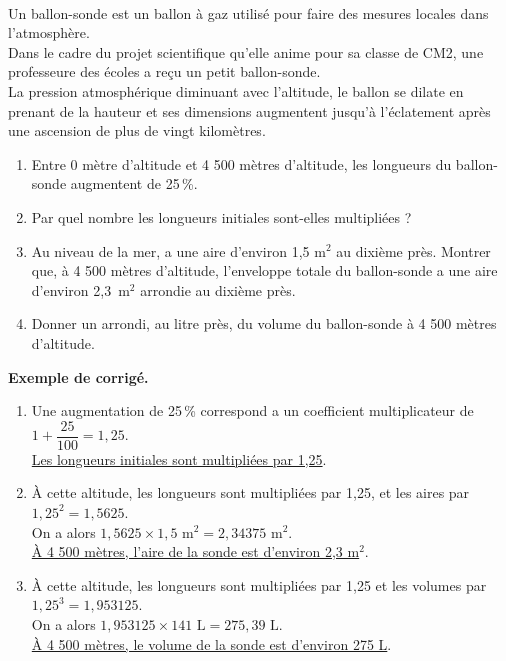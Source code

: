 \begin{activite}
   \ \\ [-16mm]
   \begin{QCM}
      Un ballon-sonde est un ballon à gaz utilisé pour faire des mesures locales dans l'atmosphère. \\
   Dans le cadre du projet scientifique qu’elle anime pour sa classe de CM2, une professeure des écoles a reçu un petit ballon-sonde. \\  
   La pression atmosphérique diminuant avec l'altitude, le ballon se dilate en prenant de la hauteur et ses dimensions augmentent jusqu’à l’éclatement après une ascension de plus de vingt kilomètres.
      \begin{enumerate}
         \item Entre 0 mètre d’altitude et 4 500 mètres d'altitude, les longueurs du ballon-sonde augmentent de 25\,\%.
         \item Par quel nombre les longueurs initiales sont-elles multipliées ?  
         \item Au niveau de la mer, a une aire d’environ 1,5 m$^2$ au dixième près. Montrer que, à 4 500 mètres d’altitude, l’enveloppe totale du ballon-sonde a une aire d’environ 2,3~m$^2$ arrondie au dixième près.        
         \item Donner un arrondi, au litre près, du volume du ballon-sonde à 4 500 mètres d'altitude. \medskip
      \end{enumerate}
   \end{QCM}
   
   \bigskip
   
   \textcolor{G1}{
   {\bf Exemple de corrigé.} \smallskip
      \begin{enumerate}
         \item Une augmentation de 25\,\% correspond a un coefficient multiplicateur de $1+\dfrac{25}{100} =1,25$. \\
               \uline{Les longueurs initiales sont multipliées par 1,25}.
         \item À cette altitude, les longueurs sont multipliées par 1,25, et les aires par $1,25^2 =1,5625$. \\
               On a alors $1,5625\times1,5\text{ m}^2 =2,34375\text{ m}^2$. \\
               \uline{À 4 500 mètres, l'aire de la sonde est d'environ 2,3 m$^2$}.
         \item À cette altitude, les longueurs sont multipliées par 1,25 et les volumes par $1,25^3 =1,953125$. \\
               On a alors $1,953125\times141\text{ L} =275,39\text{ L}$. \\
               \uline{À 4 500 mètres, le volume de la sonde est d'environ 275 L}.
      \end{enumerate}}
\end{activite}

